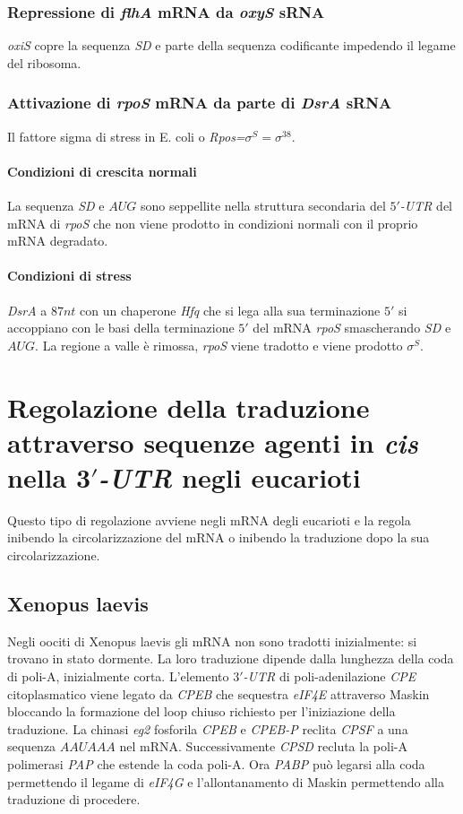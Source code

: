 \subsubsection{Repressione di \emph{flhA} mRNA da \emph{oxyS} sRNA}
\emph{oxiS} copre la sequenza \emph{SD} e parte della sequenza codificante impedendo il legame del ribosoma. 
\subsubsection{Attivazione di \emph{rpoS} mRNA da parte di \emph{DsrA} sRNA}
Il fattore sigma di stress in E. coli o \emph{Rpos=$\sigma^S=\sigma^{38}$}.
\paragraph{Condizioni di crescita normali}
La sequenza \emph{SD} e $AUG$ sono seppellite nella struttura secondaria del \emph{$5'$-UTR} del mRNA di \emph{rpoS} che non viene prodotto in condizioni normali con il proprio mRNA degradato.
\paragraph{Condizioni di stress}
\emph{DsrA} a $87nt$ con un chaperone \emph{Hfq} che si lega alla sua terminazione $5'$ si accoppiano con le basi della terminazione $5'$ del mRNA \emph{rpoS} smascherando \emph{SD} e $AUG$. La regione 
a valle \`e rimossa, \emph{rpoS} viene tradotto e viene prodotto $\sigma^S$. 
\section{Regolazione della traduzione attraverso sequenze agenti in \emph{cis} nella \emph{$\mathbf{3'}$-UTR} negli eucarioti}
Questo tipo di regolazione avviene negli mRNA degli eucarioti e la regola inibendo la circolarizzazione del mRNA o inibendo la traduzione dopo la sua circolarizzazione.
\subsection{Xenopus laevis}
Negli oociti di Xenopus laevis gli mRNA non sono tradotti inizialmente: si trovano in stato dormente. La loro traduzione dipende dalla lunghezza della coda di poli-A, inizialmente corta. L'elemento
\emph{$3'$-UTR} di poli-adenilazione \emph{CPE} citoplasmatico viene legato da \emph{CPEB} che sequestra \emph{eIF4E} attraverso Maskin bloccando la formazione del loop chiuso richiesto per l'iniziazione
della traduzione. La chinasi \emph{eg2} fosforila \emph{CPEB} e \emph{CPEB-P} reclita \emph{CPSF} a una sequenza $AAUAAA$ nel mRNA. Successivamente \emph{CPSD} recluta la poli-A polimerasi \emph{PAP}
che estende la coda poli-A. Ora \emph{PABP} pu\`o legarsi alla coda permettendo il legame di \emph{eIF4G} e l'allontanamento di Maskin permettendo alla traduzione di procedere.
